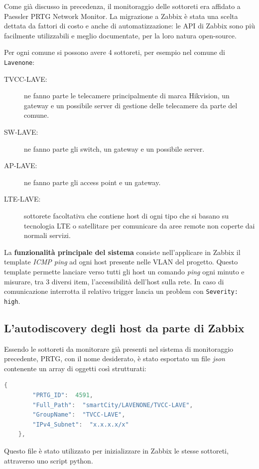 \documentclass[12pt, a4paper, oneside]{report}
\begin{document}
Come già discusso in precedenza, il monitoraggio delle sottoreti era affidato a Paessler PRTG Network Monitor.
La migrazione a Zabbix è stata una scelta dettata da fattori di costo e anche di automatizzazione: le API di Zabbix sono
più facilmente utilizzabili e meglio documentate, per la loro natura open-source.

Per ogni comune si possono avere 4 sottoreti, per esempio nel comune di \lstinline|Lavenone|:
\begin{description}
    \item [TVCC-LAVE:] ne fanno parte le telecamere principalmente di marca Hikvision, un gateway e un possibile server di gestione delle telecamere da parte del comune.
    \item [SW-LAVE: ]ne fanno parte gli switch, un gateway e un possibile server.
    \item [AP-LAVE: ]ne fanno parte gli access point e un gateway.
    \item [LTE-LAVE:] sottorete facoltativa che contiene host di ogni tipo che si basano su
          tecnologia LTE o satellitare per comunicare da aree remote non coperte dai normali servizi.
\end{description}

La \textbf{funzionalità principale del sistema} consiste nell'applicare in Zabbix il template \emph{ICMP ping}
ad ogni host presente nelle VLAN del progetto.
Questo template permette lanciare verso tutti gli host un comando \emph{ping} ogni minuto e misurare,
tra 3 diversi item, l'accessibilità dell'host sulla rete. In caso di comunicazione interrotta
il relativo trigger lancia un problem con \lstinline|Severity: high|.
\subsection{L'autodiscovery degli host da parte di Zabbix}
Essendo le sottoreti da monitorare già presenti nel sistema di monitoraggio precedente, PRTG, con il nome desiderato, è stato esportato
un file \emph{json} contenente un array di oggetti così strutturati:
\begin{lstlisting}[language=c, caption=Struttura della singola sottorete estratta da PRTG]
    {
        "PRTG_ID":  4591,
        "Full_Path":  "smartCity/LAVENONE/TVCC-LAVE",
        "GroupName":  "TVCC-LAVE",
        "IPv4_Subnet":  "x.x.x.x/x"
    },
\end{lstlisting}
Questo file è stato utilizzato per inizializzare in Zabbix le stesse sottoreti,
attraverso uno script python.
\end{document}
